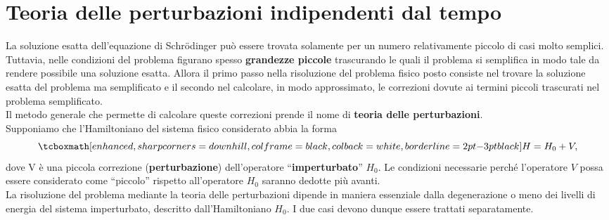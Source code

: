 \chapter[T.d.P. indipendenti dal tempo]{Teoria delle perturbazioni indipendenti dal tempo}
La soluzione esatta dell'equazione di Schr\"{o}dinger può essere trovata solamente per un numero relativamente piccolo di casi molto semplici.\\

Tuttavia, nelle condizioni del problema figurano spesso \textbf{grandezze piccole} trascurando le quali il problema si semplifica in modo tale da rendere possibile una soluzione esatta. Allora il primo passo nella risoluzione del problema fisico posto consiste nel trovare la soluzione esatta del problema ma semplificato e il secondo nel calcolare, in modo approssimato, le correzioni dovute ai termini piccoli trascurati nel problema semplificato.\\

Il metodo generale che permette di calcolare queste correzioni prende il nome di \textbf{teoria delle perturbazioni}.\\

Supponiamo che l'Hamiltoniano del sistema fisico considerato abbia la forma
	\begin{equation}
		\tcboxmath[enhanced, sharp corners=downhill, colframe=black, colback=white, borderline={2pt}{-3pt}{black}]{
			H= H_0+ V,
			}
	\end{equation}
dove V è una piccola correzione (\textbf{perturbazione}) dell'operatore ``\textbf{imperturbato}'' $H_0$. Le condizioni necessarie perché l'operatore $V$ possa essere considerato come ``piccolo'' rispetto all'operatore $H_0$ saranno dedotte più avanti.\\

La risoluzione del problema mediante la teoria delle perturbazioni dipende in maniera essenziale dalla degenerazione o meno dei livelli di energia del sistema imperturbato, descritto dall'Hamiltoniano $H_0$. I due casi devono dunque essere trattati separatamente.
